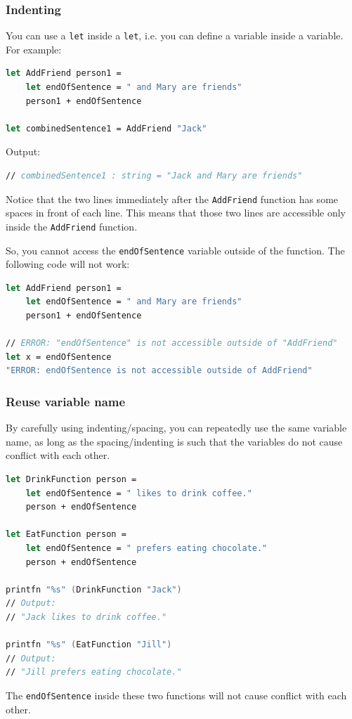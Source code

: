 \documentclass[12pt]{article}
\begin{document}
\subsubsection{Indenting}

You can use a \texttt{let} inside a \texttt{let}, i.e. you can define a variable inside a variable. For example:

\begin{lstlisting}[language=FSharp]
let AddFriend person1 =
    let endOfSentence = " and Mary are friends"
    person1 + endOfSentence

let combinedSentence1 = AddFriend "Jack"
\end{lstlisting}
Output:
\begin{lstlisting}[language=FSharp]
// combinedSentence1 : string = "Jack and Mary are friends"
\end{lstlisting}
Notice that the two lines immediately after the \texttt{AddFriend} function has some spaces in front of each line. This means that those two lines are accessible only inside the \texttt{AddFriend} function. 

So, you cannot access the \texttt{endOfSentence} variable outside of the function. The following code will not work:
\begin{lstlisting}[language=FSharp]
let AddFriend person1 =
    let endOfSentence = " and Mary are friends"
    person1 + endOfSentence

// ERROR: "endOfSentence" is not accessible outside of "AddFriend"
let x = endOfSentence
"ERROR: endOfSentence is not accessible outside of AddFriend"
\end{lstlisting}

\subsubsection{Reuse variable name}
By carefully using indenting/spacing, you can repeatedly use the same variable name, as long as the spacing/indenting is such that the variables do not cause conflict with each other.

\begin{lstlisting}[language=FSharp]
let DrinkFunction person =
    let endOfSentence = " likes to drink coffee."
    person + endOfSentence

let EatFunction person =
    let endOfSentence = " prefers eating chocolate."
    person + endOfSentence

printfn "%s" (DrinkFunction "Jack")
// Output: 
// "Jack likes to drink coffee."

printfn "%s" (EatFunction "Jill")
// Output:
// "Jill prefers eating chocolate."
\end{lstlisting}
The \texttt{endOfSentence} inside these two functions will not cause conflict with each other.
\end{document}
